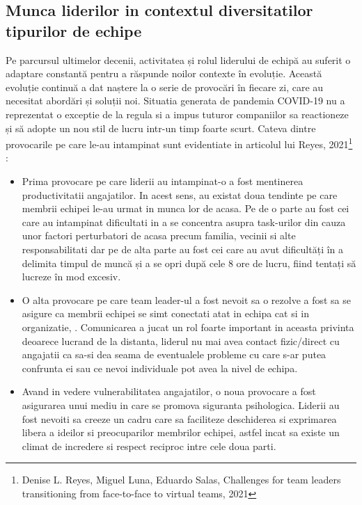 \documentclass[a4paper, 12pt]{article}
\begin{document}
	\subsection{Munca liderilor in contextul diversitatilor tipurilor de echipe }

	\quad\quad Pe parcursul ultimelor decenii, activitatea și rolul liderului de echipă au suferit o adaptare constantă pentru a răspunde noilor contexte în evoluție. Această evoluție continuă a dat naștere la o serie de provocări în fiecare zi, care au necesitat abordări și soluții noi. Situatia generata de pandemia COVID-19 nu a reprezentat o exceptie de la regula si a impus tuturor companiilor sa  reactioneze și să adopte un nou stil de lucru intr-un timp foarte scurt. Cateva dintre provocarile pe care le-au intampinat sunt evidentiate in articolul lui Reyes, 2021\footnote{Denise L. Reyes, Miguel Luna, Eduardo Salas, Challenges for team leaders transitioning from face-to-face to virtual teams, 2021} :

	\begin{itemize}

	\item Prima provocare pe care liderii au intampinat-o a fost mentinerea productivitatii angajatilor. In acest sens, au existat doua tendinte pe care membrii echipei le-au urmat in munca lor de acasa. Pe de o parte au fost cei care au intampinat dificultati in a se concentra asupra task-urilor din cauza unor factori perturbatori de acasa precum familia, vecinii si alte responsabilitati dar pe de alta parte au fost cei care au avut dificultăți în a delimita timpul de muncă și a se opri după cele 8 ore de lucru,  fiind tentați să lucreze în mod excesiv.

	\item O alta provocare pe care team leader-ul a fost nevoit sa o rezolve a fost sa se asigure ca membrii echipei se simt conectati atat in echipa cat si in organizatie, . Comunicarea a jucat un rol foarte important in aceasta privinta deoarece lucrand de la distanta, liderul nu mai avea contact fizic/direct cu angajatii ca sa-si dea seama de eventualele probleme cu care s-ar putea confrunta ei sau ce nevoi individuale pot avea la nivel de echipa.

	\item Avand in vedere vulnerabilitatea angajatilor, o noua provocare a fost asigurarea unui mediu in care se promova siguranta psihologica. Liderii au fost nevoiti sa creeze un cadru care sa faciliteze deschiderea si exprimarea libera a ideilor si preocuparilor membrilor echipei, astfel incat sa existe un climat de incredere si respect reciproc intre cele doua parti. 


	\end{itemize}
\end{document}
